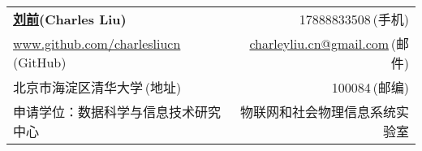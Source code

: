 \newcommand{\myheader}{
\begin{tabular*}{\textwidth}{l@{\extracolsep{\fill}}r}
  \textbf{\href{http://www.github.com/charlesliucn}{\LARGE 刘前}{(Charles Liu)}} & 17888833508$\,${\color{labelgrey}(手机)} \\
  \href{http://www.github.com/charlesliucn}{www.github.com/charlesliucn}$\,${\color{labelgrey}(GitHub)} & \href{mailto:charleyliu.cn@gmail.com}{charleyliu.cn@gmail.com}$\,${\color{labelgrey}(邮件)}\\
  北京市海淀区清华大学$\,${\color{labelgrey}(地址)} & 100084$\,${\color{labelgrey}(邮编)}\\
 申请学位：数据科学与信息技术研究中心 &  物联网和社会物理信息系统实验室\\
  \end{tabular*}\\\vspace{0.1in}}

\myheader